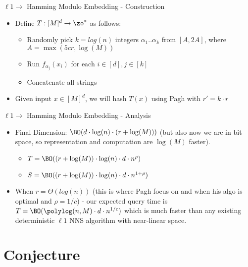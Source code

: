 \documentclass[xcolor=svgnames]{beamer}
\begin{document}
\begin{frame}{$\ell1 \rightarrow $ Hamming Modulo Embedding - Construction }
\begin{itemize}
\item Define $T : [M]^d \rightarrow \zo^*$ as follows:
\begin{itemize}
\item Randomly pick $k=log(n)$ integers $\alpha_1..\alpha_k$ from $[A, 2A]$, where $A=\max(5cr,\log(M))$
\item Run $f_{\alpha_j}(x_i)$ for each $i \in [d], j \in [k]$
\item Concatenate all strings
\end{itemize}
\item Given input $x \in [M]^d$, we will hash $T(x)$ using Pagh with $r'=k \cdot r$
\end{itemize} 
\end{frame}

\begin{frame}{$\ell1 \rightarrow $ Hamming Modulo Embedding - Analysis }
\begin{itemize}
\item Final Dimension: $\BO(d \cdot \log(n) \cdot (r +\log(M)))$ (but also now we are in bit-space, so representation and computation are $\log(M)$ faster).
\begin{itemize}
\item $T = \BO((r + \log(M)) \cdot \log(n) \cdot d \cdot n^\rho)$ 
\item $S = \BO((r + \log(M)) \cdot \log(n) \cdot d \cdot n^{1+\rho})$ 
\end{itemize} 
\item When $r=\Theta(log(n))$ (this is where Pagh focus on and when his algo is optimal and $\rho=1/c$) - our expected query time is $T = \BO(\polylog(n,M) \cdot d \cdot n^{1/c})$ which is much faster than any existing deterministic $\ell1$ NNS algorithm with near-linear space.
\end{itemize} 
\end{frame}


\section{Conjecture}
\end{document}
